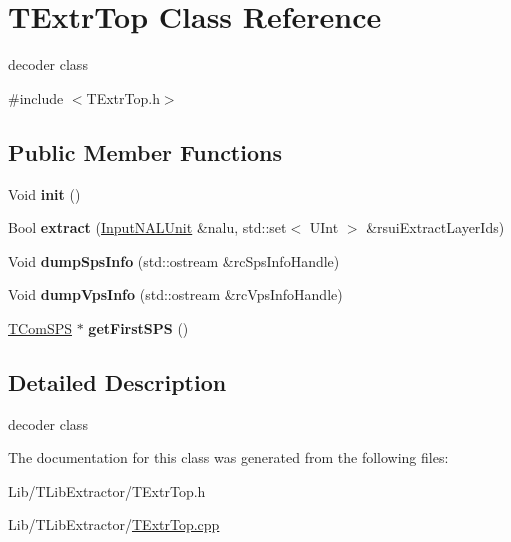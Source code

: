 \hypertarget{class_t_extr_top}{}\section{T\+Extr\+Top Class Reference}
\label{class_t_extr_top}


decoder class  




{\ttfamily \#include $<$T\+Extr\+Top.\+h$>$}

\subsection*{Public Member Functions}
\begin{DoxyCompactItemize}
\item 
\mbox{\label{class_t_extr_top_a302d12026c2bee10b833dbb03cfd73d8}} 
Void {\bfseries init} ()
\item 
\mbox{\label{class_t_extr_top_a40da4af02ed49cfa9be29d406c1e736f}} 
Bool {\bfseries extract} (\hyperlink{class_input_n_a_l_unit}{Input\+N\+A\+L\+Unit} \&nalu, std\+::set$<$ U\+Int $>$ \&rsui\+Extract\+Layer\+Ids)
\item 
\mbox{\label{class_t_extr_top_a98e892e1efc094e9d0c19fc055b02903}} 
Void {\bfseries dump\+Sps\+Info} (std\+::ostream \&rc\+Sps\+Info\+Handle)
\item 
\mbox{\label{class_t_extr_top_a01a15de60c3cd32d7923649f3bdf2553}} 
Void {\bfseries dump\+Vps\+Info} (std\+::ostream \&rc\+Vps\+Info\+Handle)
\item 
\mbox{\label{class_t_extr_top_a3b0b7630e21deaf39f3ee6190ffe4cc4}} 
\hyperlink{class_t_com_s_p_s}{T\+Com\+S\+PS} $\ast$ {\bfseries get\+First\+S\+PS} ()
\end{DoxyCompactItemize}


\subsection{Detailed Description}
decoder class 

The documentation for this class was generated from the following files\+:\begin{DoxyCompactItemize}
\item 
Lib/\+T\+Lib\+Extractor/T\+Extr\+Top.\+h\item 
Lib/\+T\+Lib\+Extractor/\hyperlink{_t_extr_top_8cpp}{T\+Extr\+Top.\+cpp}\end{DoxyCompactItemize}
